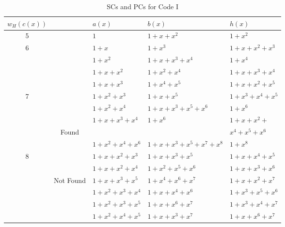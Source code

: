 \begin{table}[htbp]
		\caption{SCs and PCs for Code I}
		\centering
		\begin{tabularx}{0.75\textwidth}{|c|c|XXX} 
			\toprule
			$w_H(c(x))$&~& $a(x)$ & $b(x)$ & $h(x)$ \\ %
			\midrule
			5& ~&$1$ & $1+x+x^{2}$ & $1+x^2$\\
			\cline{1-5}
			6& ~&$1+x$ & $1+x^3$ & $1+x+x^2+x^3$\\
			&~ &$1+x^2$ & $1+x+x^3+x^4$ & $1+x^{4}$\\
			&~&$1+x+x^2$ & $1+x^2+x^4$ & $1+x+x^3+x^4$\\
			&~&$1+x+x^3$ & $1+x^4+x^5$ & $1+x+x^2+x^5$\\
			\cline{1-5}
			7&~&$1+x^2+x^3$ & $1+x+x^5$ & $1+x^3+x^4+x^5$\\
			&~&$1+x^2+x^4$ & $1+x+x^3+x^5+x^6$ & $1+x^{6}$\\			
			\cline{1-5}
			&~&$1+x+x^3+x^4$ & $1+x^6$ & $1+x+x^2+$\\
			&Found&&&$x^4+x^5+x^6$\\
			&~&$1+x^2+x^4+x^6$ & $1+x+x^3+x^5+x^7+x^8$ & $1+x^8$\\
			\cline{2-5}
			8&&$1+x+x^2+x^3$ 		&$1+x+x^3+x^5$ 		& $1+x+x^4+x^5$\\
			&&$1+x+x^2+x^4$ 		&$1+x^2+x^5+x^6$		& $1+x+x^3+x^6$\\
			&Not Found&$1+x+x^3+x^5$ 		&$1+x^4+x^6+x^7$ 		& $1+x+x^2+x^7$\\
			&&$1+x^2+x^3+x^4$ 	&$1+x+x^4+x^6$ 		& $1+x^3+x^5+x^6$\\
			&&$1+x^2+x^3+x^5$ 	&$1+x+x^6+x^7$ 		& $1+x^3+x^4+x^7$\\
			&&$1+x^2+x^4+x^5$ 	&$1+x+x^3+x^7$ 		& $1+x+x^6+x^7$\\
			\bottomrule
		\end{tabularx}		
		\label{code-tables-1}
	\end{table}


